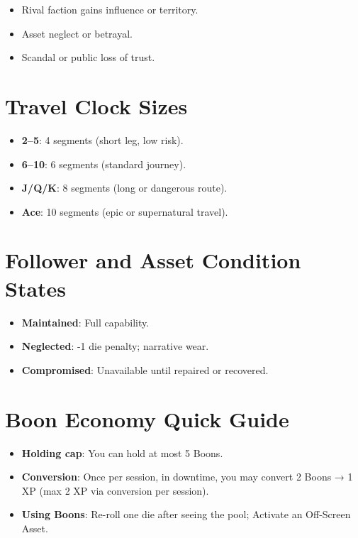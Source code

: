 \begin{itemize}
    \item Rival faction gains influence or territory.
    \item Asset neglect or betrayal.
    \item Scandal or public loss of trust.
\end{itemize}

\section*{Travel Clock Sizes}

\begin{itemize}
    \item \textbf{2--5}: 4 segments (short leg, low risk).
    \item \textbf{6--10}: 6 segments (standard journey).
    \item \textbf{J/Q/K}: 8 segments (long or dangerous route).
    \item \textbf{Ace}: 10 segments (epic or supernatural travel).
\end{itemize}

\section*{Follower and Asset Condition States}

\begin{itemize}
    \item \textbf{Maintained}: Full capability.
    \item \textbf{Neglected}: -1 die penalty; narrative wear.
    \item \textbf{Compromised}: Unavailable until repaired or recovered.
\end{itemize}

\section*{Boon Economy Quick Guide}

\begin{itemize}
    \item \textbf{Holding cap}: You can hold at most 5 Boons.
    \item \textbf{Conversion}: Once per session, in downtime, you may convert 2 Boons → 1 XP (max 2 XP via conversion per session).
    \item \textbf{Using Boons}: Re-roll one die after seeing the pool; Activate an Off-Screen Asset.
\end{itemize}

